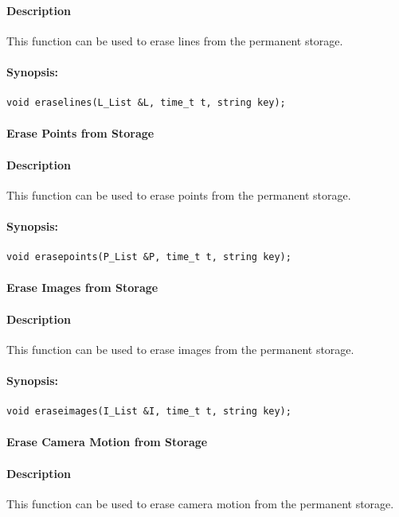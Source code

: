 \paragraph{Description}
This function can be used to erase lines from the permanent storage.
\paragraph{Synopsis:}
\begin{lstlisting}
void eraselines(L_List &L, time_t t, string key);
\end{lstlisting}


\paragraph{ Erase Points from Storage}
\paragraph{Description}
This function can be used to erase points from the permanent storage.
\paragraph{Synopsis:}
\begin{lstlisting}
void erasepoints(P_List &P, time_t t, string key);
\end{lstlisting}

\paragraph{ Erase Images from Storage}
\paragraph{Description}
This function can be used to erase images from the permanent storage. 
\paragraph{Synopsis:}
\begin{lstlisting}
void eraseimages(I_List &I, time_t t, string key);
\end{lstlisting}


\paragraph{ Erase Camera Motion from  Storage}
\paragraph{Description}
This function can be used to erase camera motion from the permanent storage.
